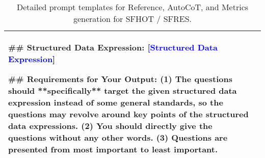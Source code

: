 \begin{table*} [t]
{\begin{tabular}{l >{\raggedright\arraybackslash}m{}}
\#\# Structured Data Expression: \newline
\textcolor{blue}{[Structured Data Expression]} \newline

\#\# Requirements for Your Output: \newline
(1) The questions should **specifically** target the given structured data expression instead of some general standards, so the questions may revolve around key points of the structured data expressions. \newline
(2) You should directly give the questions without any other words. \newline
(3) Questions are presented from most important to least important. \\
\bottomrule
\end{tabular}
}
\vspace{-2mm}
\caption{Detailed prompt templates for Reference, AutoCoT, and Metrics generation for SFHOT / SFRES. }
\label{tab:generation_prompt_sfhot}
\end{table*}